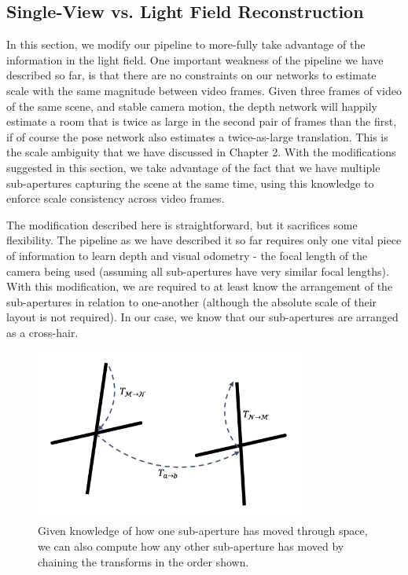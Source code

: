 \subsection{Single-View vs. Light Field Reconstruction}



In this section, we modify our pipeline to more-fully take advantage of the information in the light field. One important weakness of the pipeline we have described so far, is that there are no constraints on our networks to estimate scale with the same magnitude between video frames. Given three frames of video of the same scene, and stable camera motion, the depth network will happily estimate a room that is twice as large in the second pair of frames than the first, if of course the pose network also estimates a twice-as-large translation. This is the scale ambiguity that we have discussed in Chapter 2. With the modifications suggested in this section, we take advantage of the fact that we have multiple sub-apertures capturing the scene at the same time, using this knowledge to enforce scale consistency across video frames. 

The modification described here is straightforward, but it sacrifices some flexibility. The pipeline as we have described it so far requires only one vital piece of information to learn depth and visual odometry - the focal length of the camera being used (assuming all sub-apertures have very similar focal lengths). With this modification, we are required to at least know the arrangement of the sub-apertures in relation to one-another (although the absolute scale of their layout is not required). In our case, we know that our sub-apertures are arranged as a cross-hair. 

\begin{figure}[htbp]
    \centering 
    \includegraphics[width=3.5in]{images/relative_subapertures.png}
    \caption[The relationship between sub-apertures as the light field camera moves through space]{Given knowledge of how one sub-aperture has moved through space, we can also compute how any other sub-aperture has moved by chaining the transforms in the order shown.}
\end{figure}


